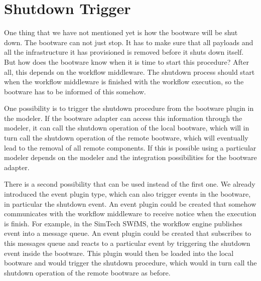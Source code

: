 \section{Shutdown Trigger}
\label{design:shutdown}

One thing that we have not mentioned yet is how the bootware will be shut down.
The bootware can not just stop.
It has to make sure that all payloads and all the infrastructure it has provisioned is removed before it shuts down itself.
But how does the bootware know when it is time to start this procedure?
After all, this depends on the workflow middleware.
The shutdown process should start when the workflow middleware is finished with the workflow execution, so the bootware has to be informed of this somehow.

One possibility is to trigger the shutdown procedure from the bootware plugin in the modeler.
If the bootware adapter can access this information through the modeler, it can call the shutdown operation of the local bootware, which will in turn call the shutdown operation of the remote bootware, which will eventually lead to the removal of all remote components.
If this is possible using a particular modeler depends on the modeler and the integration possibilities for the bootware adapter.

There is a second possibility that can be used instead of the first one.
We already introduced the event plugin type, which can also trigger events in the bootware, in particular the shutdown event.
An event plugin could be created that somehow communicates with the workflow middleware to receive notice when the execution is finish.
For example, in the SimTech SWfMS, the workflow engine publishes event into a message queue.
An event plugin could be created that subscribes to this messages queue and reacts to a particular event by triggering the shutdown event inside the bootware.
This plugin would then be loaded into the local bootware and would trigger the shutdown procedure, which would in turn call the shutdown operation of the remote bootware as before.
